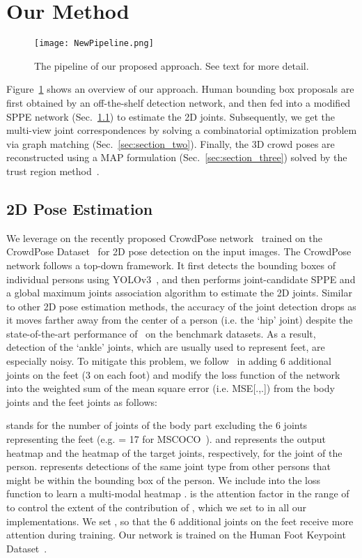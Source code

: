 \documentclass[runningheads]{llncs}
\begin{document}
\section{Our Method}
\begin{figure}[!hbt]
\centering
\texttt{[image: NewPipeline.png]}
\caption{The pipeline of our proposed approach. See text for more detail.
}
\label{fig:pipeline}
\end{figure}
\noindent Figure~\ref{fig:pipeline} shows an overview of our approach. Human bounding box proposals are first obtained by an off-the-shelf detection network, and then fed into a modified SPPE network (Sec.~\ref{sec:section_one}) to estimate the 2D joints. Subsequently, we get the multi-view joint correspondences by solving a combinatorial optimization problem via graph matching (Sec.~\ref{sec:section_two}). Finally, the 3D crowd poses are reconstructed using a MAP formulation
(Sec.~\ref{sec:section_three}) solved by the trust region method~\cite{conn2000trust}.



\subsection{2D Pose Estimation}
\label{sec:section_one}
We leverage on the recently proposed CrowdPose network~\cite{li2019crowdpose} trained on the CrowdPose Dataset~\cite{li2019crowdpose} for 2D pose detection on the input images. The CrowdPose network follows a top-down framework. It first detects the bounding boxes of individual persons using YOLOv3~\cite{redmon2018yolov3}, and then performs joint-candidate SPPE and a global maximum joints association algorithm to estimate the 2D joints. Similar to other 2D pose estimation methods, the accuracy of the joint detection drops as it moves farther away from the center of a person (i.e. the `hip' joint) despite the state-of-the-art performance of~\cite{li2019crowdpose} on the benchmark datasets.
As a result, detection of the `ankle' joints, which are usually used to represent feet, are especially noisy. To mitigate this problem, we follow~\cite{cao2018openpose} in adding 6 additional joints on the feet (3 on each foot) and modify the loss function of the network into the weighted sum of the mean square error (i.e. MSE[.,.]) from the body joints and the feet joints as follows:

 stands for the number of joints of the body part excluding the 6 joints representing the feet (e.g.  = 17 for MSCOCO~\cite{lin2014microsoft}). 
 and  represents the output heatmap and the heatmap of the target joints, respectively, for the  joint of the  person.  represents detections of the same joint type from other persons that might be within the bounding box of the  person. 
We include  into the loss function to learn a multi-modal heatmap .
 is the attention factor in the range of  to control the extent of the contribution of , which we set to  in all our implementations.  We set , so that the 6 additional joints on the feet receive more attention during training. Our network is trained on the Human Foot Keypoint Dataset~\cite{cao2018openpose}.
\end{document}
